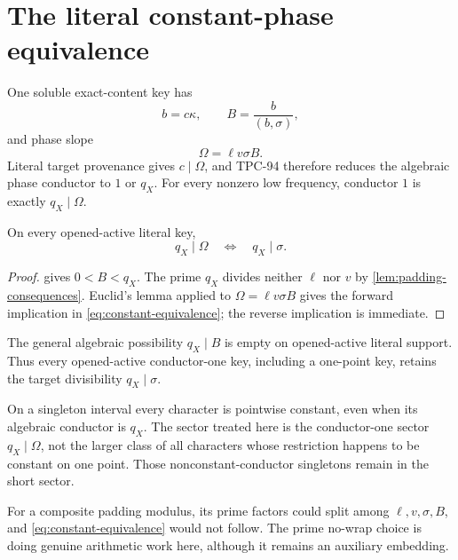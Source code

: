 \section{The literal constant-phase equivalence}
\label{sec:dichotomy}

One soluble exact-content key has
\[
 b=c\kappa,\qquad
 B=\frac{b}{(b,\sigma)},
\]
and phase slope
\begin{equation}
 \Omega=\ell v\sigma B.
\label{eq:phase-slope}
\end{equation}
Literal target provenance gives \(c\mid\Omega\), and TPC-94 therefore
reduces the algebraic phase conductor to \(1\) or \(q_X\).  For every
nonzero low frequency, conductor \(1\) is exactly \(q_X\mid\Omega\).

\begin{theorem}
\label{thm:constant-dichotomy}
On every opened-active literal key,
\begin{equation}
 q_X\mid\Omega
 \quad\Longleftrightarrow\quad
 q_X\mid\sigma.
\label{eq:constant-equivalence}
\end{equation}
\end{theorem}

\begin{proof}
 gives \(0<B<q_X\).
The prime \(q_X\) divides neither \(\ell\) nor \(v\) by
\cref{lem:padding-consequences}.  Euclid's lemma applied to
\(\Omega=\ell v\sigma B\) gives the forward implication in
\eqref{eq:constant-equivalence}; the reverse implication is
immediate.
\end{proof}

\begin{corollary}
\label{cor:qB-return}
The general algebraic possibility \(q_X\mid B\) is empty on
opened-active literal support.  Thus every opened-active
conductor-one key, including a one-point key, retains the target
divisibility \(q_X\mid\sigma\).
\end{corollary}

\begin{remark}
On a singleton interval every character is pointwise constant, even
when its algebraic conductor is \(q_X\).  The sector treated here is
the conductor-one sector \(q_X\mid\Omega\), not the larger class of
all characters whose restriction happens to be constant on one
point.  Those nonconstant-conductor singletons remain in the short
sector.
\end{remark}

\begin{remark}
For a composite padding modulus, its prime factors could split among
\(\ell,v,\sigma,B\), and \eqref{eq:constant-equivalence} would
not follow.  The prime no-wrap choice is doing genuine arithmetic
work here, although it remains an auxiliary embedding.
\end{remark}
